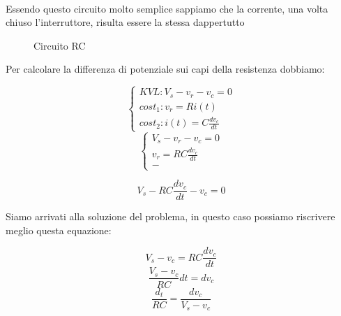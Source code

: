 \paragraph{}
Essendo questo circuito molto semplice sappiamo che la corrente, una volta chiuso l'interruttore, risulta essere la stessa dappertutto



\begin{figure}
    \centering
    \caption{Circuito RC}
    \label{fig:my_label}
\end{figure}

Per calcolare la differenza di potenziale sui capi della resistenza dobbiamo:

$$
\begin{cases}
    KVL : V_s - v_r - v_c = 0 \\
    cost_1 : v_r = R i(t) \\
    cost_2 : i(t) = C\frac{dv_c}{dt}
\end{cases}
$$
$$
\begin{cases}
    V_s - v_r - v_c = 0 \\
    v_r = R C\frac{dv_c}{dt} \\
    -
\end{cases}
$$

\begin{equation}
    V_s - R C\frac{dv_c}{dt} - v_c = 0 
    \label{equazioneRiferimentoCircuitiRC}
\end{equation}

Siamo arrivati alla soluzione del problema, in questo caso possiamo riscrivere meglio questa equazione:

\begin{equation*}
    V_s - v_c = R C\frac{dv_c}{dt}
\end{equation*}
\begin{equation*}
    \frac{V_s - v_c}{RC} dt= dv_c
\end{equation*}
\begin{equation*}
    \frac{d_t}{RC}= \frac{dv_c}{V_s - v_c}
\end{equation*}

